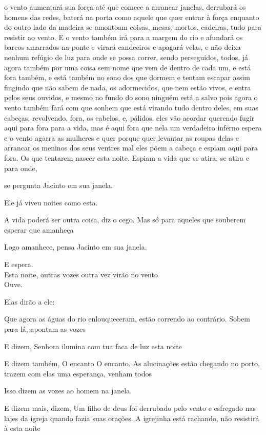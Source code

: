 o vento aumentará sua força até que comece a arrancar janelas, derrubará
os homens das redes, baterá na porta como aquele que quer entrar à força
enquanto do outro lado da madeira se amontoam coisas, mesas, mortos,
cadeiras, tudo para resistir ao vento. E o vento também irá para a
margem do rio e afundará os barcos amarrados na ponte e virará
candeeiros e apagará velas, e não deixa nenhum refúgio de luz para onde
se possa correr, sendo perseguidos, todos, já agora também por uma coisa
sem nome que vem de dentro de cada um, e está fora também, e está também
no sono dos que dormem e tentam escapar assim fingindo que não sabem de
nada, os adormecidos, que nem estão vivos, e entra pelos seus ouvidos, e
mesmo no fundo do sono ninguém está a salvo pois agora o vento também
fará com que sonhem que está virando tudo dentro deles, em suas cabeças,
revolvendo, fora, os cabelos, e, pálidos, eles vão acordar querendo
fugir aqui para fora para a vida, mas é aqui fora que nela um verdadeiro
inferno espera e o vento agarra as mulheres e quer porque quer levantar
as roupas delas e arrancar os meninos dos seus ventres mal eles põem a
cabeça e espiam aqui para fora. Os que tentarem nascer esta noite.
Espiam a vida que se atira, se atira e para onde,

se pergunta Jacinto em sua janela.

Ele já viveu noites como esta.

A vida poderá ser outra coisa, diz o cego. Mas só para aqueles que
souberem esperar que amanheça

Logo amanhece, pensa Jacinto em sua janela.

E espera.\\

Esta noite, outras vozes outra vez virão no vento\\

Ouve.

Elas dirão a ele:

Que agora as águas do rio enlouqueceram, estão correndo ao contrário.
Sobem para lá, apontam as vozes

E dizem, Senhora ilumina com tua faca de luz esta noite

E dizem também, O encanto O encanto. As alucinações estão chegando no
porto, trazem com elas uma esperança, venham todos

Isso dizem as vozes ao homem na janela.

E dizem mais, dizem, Um filho de deus foi derrubado pelo vento e
esfregado nas lajes da igreja quando fazia suas orações. A igrejinha
está rachando, não resistirá à esta noite

